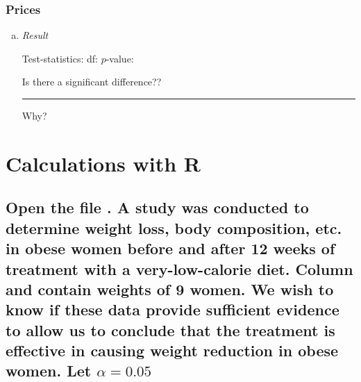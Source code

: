 \subsubsection{Prices}
	\begin{enumerate}[a)]
	\item \emph{Result}
	
		Test-statistics: \hrulefill\quad df: \hrulefill\quad $p$-value: \hrulefill
		
		Is there a significant difference?? \rule{5em}{0.4pt} Why? \hrulefill
	\end{enumerate}
	
\section{Calculations with R}

\subsection{Open the file . A study was conducted to determine weight loss, body composition, etc. in obese women before and after 12 weeks of treatment with a very-low-calorie diet. Column  and  contain weights of 9 women. We wish to know if these data provide sufficient evidence to allow us to conclude that the treatment is effective in causing weight reduction in obese women. Let $\alpha= 0.05$}

